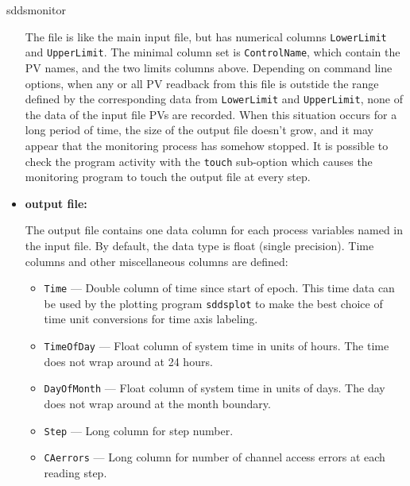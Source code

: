 \begin{sddsprog}{sddsmonitor}
\begin{itemize}
The file is like the main input file, but has numerical columns \verb+LowerLimit+ and \verb+UpperLimit+.
The minimal column set is \verb+ControlName+, which contain the PV names, and the two limits columns above.
Depending on command line options, when any or all PV readback from this file
is outstide the range defined by the corresponding data from \verb+LowerLimit+ and \verb+UpperLimit+,
none of the data of the input file PVs are recorded. 
When this situation occurs for a long period of time, the size of the output file doesn't
grow, and it may appear that the monitoring process has somehow stopped.
It is possible to check the program activity with the \verb+touch+ sub-option
which causes the monitoring program to touch the output file at every step.

\item {\bf output file:}\par
The output file contains one data column for each process variables named in the input file. By default,
the data type is float (single precision).
Time columns and other miscellaneous columns are defined: 
\begin{itemize}
        \item {\tt Time} --- Double column of time since start of epoch. This time data can be used by
        the plotting program {\verb+sddsplot+} to make the best choice of time unit conversions
        for time axis labeling.
        \item {\tt TimeOfDay} --- Float column of system time in units of hours. 
        The time does not wrap around at 24 hours.
        \item {\tt DayOfMonth} --- Float column of system time in units of days. 
        The day does not wrap around at the month boundary.
        \item {\tt Step} --- Long column for step number.
        \item {\tt CAerrors} --- Long column for number of channel access errors at each reading step. 
\end{itemize}


\end{itemize}
\end{sddsprog}

